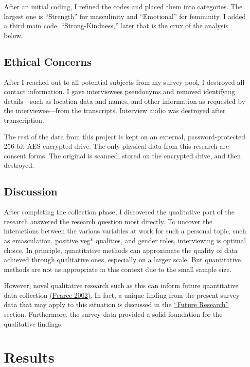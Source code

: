 \documentclass[twoside]{report}
\let\oldsection\section
\renewcommand\section{\clearpage\oldsection}
\begin{document}
After an initial coding, I refined the codes and placed them into categories. The largest one is ``Strength'' for masculinity and ``Emotional'' for femininity. I added a third main code, ``Strong-Kindness,'' later that is the crux of the analysis below.

\subsection{Ethical Concerns}

After I reached out to all potential subjects from my survey pool, I destroyed all contact information. I gave interviewees pseudonyms and removed identifying details---such as location data and names, and other information as requested by the interviewee---from the transcripts. Interview audio was destroyed after transcription.

The rest of the data from this project is kept on an external, password-protected 256-bit AES encrypted drive. The only physical data from this research are consent forms. The original is scanned, stored on the encrypted drive, and then destroyed.

\subsection{Discussion}

After completing the collection phase, I discovered the qualitative part of the research answered the research question most directly. To uncover the interactions between the various variables at work for such a personal topic, such as emasculation, positive veg* qualities, and gender roles, interviewing is optimal choice. In principle, quantitative methods can approximate the quality of data achieved through qualitative ones, especially on a larger scale. But quantitative methods are not as appropriate in this context due to the small sample size.

However, novel qualitative research such as this can inform future quantitative data collection \hyperlink{pearce}{(Pearce 2002)}. In fact, a unique finding from the present survey data that may apply to this situation is discussed in the \hyperlink{future-research}{``Future Research''} section. Furthermore, the survey data provided a solid foundation for the qualitative findings.

\section{Results}
\end{document}

